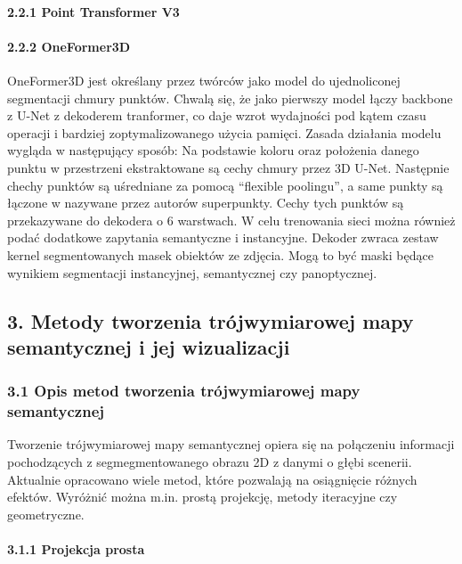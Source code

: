 \documentclass[
]{article}
\begin{document}
\paragraph{2.2.1 Point Transformer V3}\label{point-transformer-v3}

\paragraph{2.2.2 OneFormer3D}\label{oneformer3d}

OneFormer3D jest określany przez twórców jako model do ujednoliconej segmentacji chmury punktów. Chwalą się, że jako pierwszy model łączy backbone z U-Net z dekoderem tranformer, co daje wzrot wydajności pod kątem czasu operacji i bardziej zoptymalizowanego użycia pamięci.
Zasada działania modelu wygląda w następujący sposób:
Na podstawie koloru oraz położenia danego punktu w przestrzeni ekstraktowane są cechy chmury przez 3D U-Net. Następnie chechy punktów są uśredniane za pomocą ``flexible poolingu'', a same punkty są łączone w nazywane przez autorów superpunkty. Cechy tych punktów są przekazywane do dekodera o 6 warstwach. W celu trenowania sieci można również podać dodatkowe zapytania semantyczne i instancyjne. Dekoder zwraca zestaw kernel segmentowanych masek obiektów ze zdjęcia. Mogą to być maski będące wynikiem segmentacji instancyjnej, semantycznej czy panoptycznej.

\subsection{3. Metody tworzenia trójwymiarowej mapy semantycznej i jej wizualizacji}\label{metody-tworzenia-truxf3jwymiarowej-mapy-semantycznej-i-jej-wizualizacji}

\subsubsection{3.1 Opis metod tworzenia trójwymiarowej mapy semantycznej}\label{opis-metod-tworzenia-truxf3jwymiarowej-mapy-semantycznej}

Tworzenie trójwymiarowej mapy semantycznej opiera się na połączeniu informacji pochodzących z segmegmentowanego obrazu 2D z danymi o głębi scenerii. Aktualnie opracowano wiele metod, które pozwalają na osiągnięcie różnych efektów. Wyróżnić można m.in. prostą projekcję, metody iteracyjne czy geometryczne.

\paragraph{3.1.1 Projekcja prosta}\label{projekcja-prosta}
\end{document}
